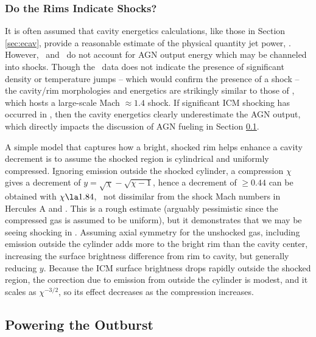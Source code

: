 \documentclass[apjpt4]{aastex}
\begin{document}
\subsubsection{Do the Rims Indicate Shocks?}
\label{sec:shocks}

It is often assumed that cavity energetics calculations, like those in
Section \ref{sec:ecav}, provide a reasonable estimate of the physical
quantity jet power, \pjet. However, \pcav\ and \pjet\ do not account
for AGN output energy which may be channeled into shocks. Though the
\cxo\ data does not indicate the presence of significant density or
temperature jumps -- which would confirm the presence of a shock --
the cavity/rim morphologies and energetics are strikingly similar to
those of \ms, which hosts a large-scale Mach $\approx 1.4$ shock. If
significant ICM shocking has occurred in \rbs, then the cavity
energetics clearly underestimate the AGN output, which directly
impacts the discussion of AGN fueling in Section \ref{sec:accretion}.

A simple model that captures how a bright, shocked rim helps enhance a
cavity decrement is to assume the shocked region is cylindrical and
uniformly compressed. Ignoring emission outside the shocked cylinder,
a compression $\chi$ gives a decrement of $y = \sqrt{\chi} -
\sqrt{\chi - 1}$, hence a decrement of $\ge 0.44$ can be obtained with
$\chi \la 1.84$, \ie\ not dissimilar from the shock Mach numbers in
Hercules A and \ms. This is a rough estimate (arguably pessimistic
since the compressed gas is assumed to be uniform), but it
demonstrates that we may be seeing shocking in \rbs. Assuming axial
symmetry for the unshocked gas, including emission outside the
cylinder adds more to the bright rim than the cavity center,
increasing the surface brightness difference from rim to cavity, but
generally reducing $y$. Because the ICM surface brightness drops
rapidly outside the shocked region, the correction due to emission
from outside the cylinder is modest, and it scales as $\chi^{-3/2}$,
so its effect decreases as the compression increases.

\subsection{Powering the Outburst}
\label{sec:accretion}
\end{document}
